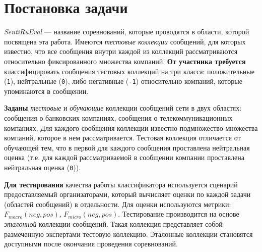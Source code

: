 \newpage
\section{Постановка задачи}

    {\it SentiRuEval} --- название соревнований, которые проводятся в
    области, которой посвящена эта работа.
    Имеются {\it тестовые коллекции} сообщений, для которых известно, что
    все сообщения внутри каждой из коллекций рассматриваются относительно
    фиксированного множества компаний.
    {\bf От участника требуется} классифицировать сообщения тестовых коллекций на три
    класса: положительные ({\tt 1}), нейтральные ({\tt 0}), либо негативные ({\tt -1}) относительно компаний,
    которые упоминаются в сообщении.

    {\bf Заданы} {\it тестовые} и {\it обучающие} коллекции сообщений сети \twitter в двух областях:
    сообщения о банковских компаниях,
    сообщения о телекоммуникационных компаниях.
    Для каждого сообщения коллекции известно подмножество
    множества компаний, которое в нем рассматривается.
    Тестовая коллекция отличается от обучающей тем, что в первой для каждого
    сообщения проставлена нейтральная оценка
    (т.е. для каждой рассматриваемой в сообщении компании проставлена нейтральная оценка ({\tt 0})).

    {\bf Для тестирования} качества работы классификатора используется сценарий
    предоставляемый организаторами, который вычисляет оценки по каждой задачи
    (областей сообщений) в отдельности. Для оценки используются метрики:
    $F_{macro}(neg, pos)$,
    $F_{micro}(neg, pos)$.
    Тестирование производится на основе {\it эталонной} коллекции сообщений.
    Такая коллекция представляет собой размеченную экспертами тестовую коллекцию.
    Эталонные коллекции становятся доступными после окончания проведения
    соревнований.
